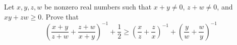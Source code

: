 Let $ x, y, z, w $ be nonzero real numbers such that $ x+y \ne 0$,  $ z+w \ne 0 $,  and $ xy+zw \ge 0 $. Prove that\[  \left( \frac{x+y}{z+w} + \frac{z+w}{x+y} \right) ^{-1} + \frac{1}{2} \ge \left( \frac{x}{z} + \frac{z}{x} \right) ^{-1} + \left( \frac{y}{w} + \frac{w}{y} \right) ^{-1}\]
